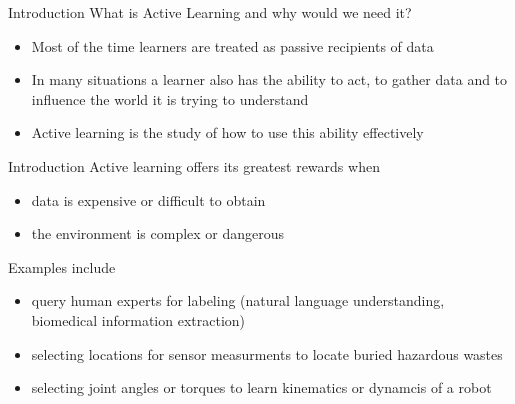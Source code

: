 \documentclass[10pt]{beamer}
\begin{document}
\begin{frame}{Introduction}
What is Active Learning and why would we need it?
\begin{itemize}
  \item Most of the time learners are treated as passive recipients of data
  \item In many situations a learner also has the ability to act, to gather data
    and to influence the world it is trying to understand
  \item Active learning is the study of how to use this ability effectively
\end{itemize}

\begin{center}\end{center}
\end{frame}

\begin{frame}{Introduction}
Active learning offers its greatest rewards when
\begin{itemize}
  \item data is expensive or difficult to obtain
  \item the environment is complex or dangerous
\end{itemize}
Examples include
\begin{itemize}
  \item query human experts for labeling (natural language understanding,
    biomedical information extraction)
  \item selecting locations for sensor measurments to locate buried hazardous wastes
  \item selecting joint angles or torques to learn kinematics or dynamcis of a robot
\end{itemize}
\end{frame}
\end{document}
